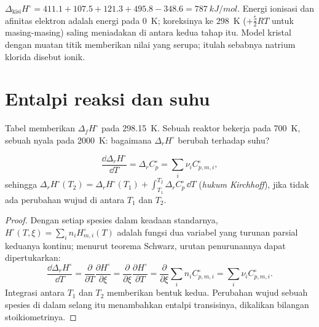 \begin{example}\label{ex:b2:reaction-enthalpy:nacl}
$\Delta_{\text{kisi}}H^\circ = 411.1 + 107.5 + 121.3 + 495.8 - 348.6 =
\qty{787}{kJ/mol}$. Energi ionisasi dan afinitas elektron adalah energi
pada \qty{0}{K}; koreksinya ke \qty{298}{K} ($+\tfrac52RT$ untuk
masing-masing) saling meniadakan di antara kedua tahap itu. Model kristal
dengan muatan titik memberikan nilai yang serupa; itulah sebabnya natrium
klorida disebut ionik.
\end{example}

\section{Entalpi reaksi dan suhu}

Tabel memberikan $\Delta_f H^\circ$ pada \qty{298.15}{K}. Sebuah reaktor
bekerja pada \qty{700}{K}, sebuah nyala pada \qty{2000}{K}: bagaimana
$\Delta_r H^\circ$ berubah terhadap suhu?

\begin{theorem}\label{thm:b2:reaction-enthalpy:kirchhoff}
\[
  \frac{\dd\Delta_r H^\circ}{\dd T} = \Delta_r C_p^\circ =
  \sum_i\nu_i C_{p,m,i}^\circ ,
\]
sehingga $\Delta_r H^\circ(T_2) = \Delta_r H^\circ(T_1) + \int_{T_1}^{T_2}
\Delta_r C_p^\circ\,\dd T$ (\emph{hukum Kirchhoff}),
jika tidak ada perubahan wujud di antara $T_1$ dan $T_2$.
\end{theorem}

\begin{proof}
Dengan setiap spesies dalam keadaan standarnya, $H^\circ(T, \xi) = \sum_in_i
H^\circ_{m,i}(T)$ adalah fungsi dua variabel yang turunan parsial
keduanya kontinu; menurut teorema Schwarz, urutan penurunannya dapat
dipertukarkan:
\[
  \frac{\dd\Delta_r H^\circ}{\dd T} = \frac{\partial}{\partial T}
  \frac{\partial H^\circ}{\partial\xi} = \frac{\partial}{\partial\xi}
  \frac{\partial H^\circ}{\partial T} = \frac{\partial}{\partial\xi}
  \sum_in_iC^\circ_{p,m,i} = \sum_i\nu_iC^\circ_{p,m,i}.
\]
Integrasi antara $T_1$ dan $T_2$ memberikan bentuk kedua. Perubahan wujud
sebuah spesies di dalam selang itu menambahkan entalpi transisinya,
dikalikan bilangan stoikiometrinya.
\end{proof}

